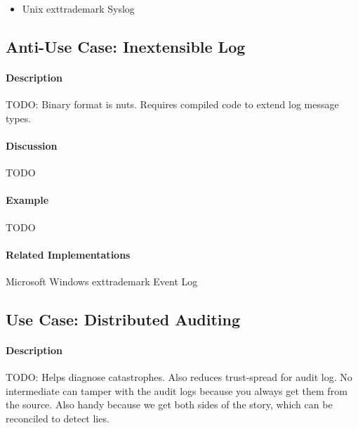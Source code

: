 \begin{itemize}
        \item Unix        exttrademark Syslog
\end{itemize}

\subsection{Anti-Use Case: Inextensible Log}

\paragraph{Description}

{\Large TODO:} Binary format is nuts. Requires compiled code to extend log message types.

\paragraph{Discussion}

{\Large TODO}

\paragraph{Example}

{\Large TODO}

\paragraph{Related Implementations}

Microsoft Windows        exttrademark Event Log

\subsection{Use Case: Distributed Auditing}

\paragraph{Description}

{\Large TODO:} Helps diagnose catastrophes.  Also reduces trust-spread for audit log.  No intermediate can tamper with the audit logs because you always get them from the source.  Also handy because we get both sides of the story, which can be reconciled to detect lies.

